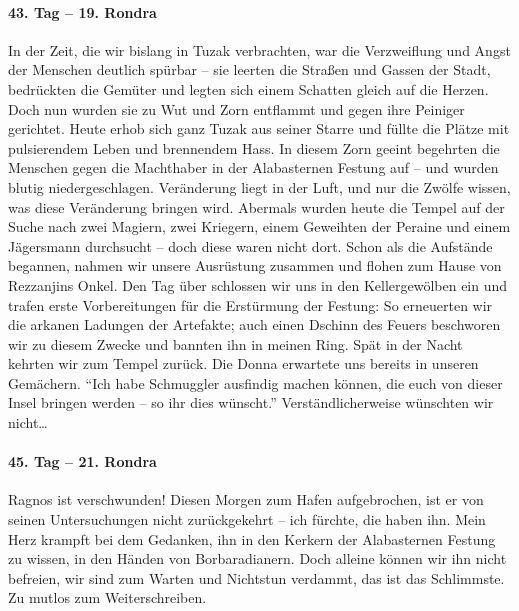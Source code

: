 \paragraph{43. Tag -- 19. Rondra}
In der Zeit, die wir bislang in Tuzak verbrachten, war die Verzweiflung und Angst der Menschen deutlich spürbar -- sie leerten die Straßen und Gassen der Stadt, bedrückten die Gemüter und legten sich einem Schatten gleich auf die Herzen. Doch nun wurden sie zu Wut und Zorn entflammt und gegen ihre Peiniger gerichtet. Heute erhob sich ganz Tuzak aus seiner Starre und füllte die Plätze mit pulsierendem Leben und brennendem Hass. In diesem Zorn geeint begehrten die Menschen gegen die Machthaber in der Alabasternen Festung auf -- und wurden blutig niedergeschlagen. Veränderung liegt in der Luft, und nur die Zwölfe wissen, was diese Veränderung bringen wird. Abermals wurden heute die Tempel auf der Suche nach zwei Magiern, zwei Kriegern, einem Geweihten der Peraine und einem Jägersmann durchsucht -- doch diese waren nicht dort. Schon als die Aufstände begannen, nahmen wir unsere Ausrüstung zusammen und flohen zum Hause von Rezzanjins Onkel. Den Tag über schlossen wir uns in den Kellergewölben ein und trafen erste Vorbereitungen für die Erstürmung der Festung: So erneuerten wir die arkanen Ladungen der Artefakte; auch einen Dschinn des Feuers beschworen wir zu diesem Zwecke und bannten ihn in meinen Ring. Spät in der Nacht kehrten wir zum Tempel zurück. Die Donna erwartete uns bereits in unseren Gemächern. ``Ich habe Schmuggler ausfindig machen können, die euch von dieser Insel bringen werden -- so ihr dies wünscht.'' Verständlicherweise wünschten wir nicht\dots

\paragraph{45. Tag -- 21. Rondra}

Ragnos ist verschwunden! Diesen Morgen zum Hafen aufgebrochen, ist er von seinen Untersuchungen nicht zurückgekehrt -- ich fürchte, die haben ihn. Mein Herz krampft bei dem Gedanken, ihn in den Kerkern der Alabasternen Festung zu wissen, in den Händen von Borbaradianern. Doch alleine können wir ihn nicht befreien, wir sind zum Warten und Nichtstun verdammt, das ist das Schlimmste. Zu mutlos zum Weiterschreiben.

